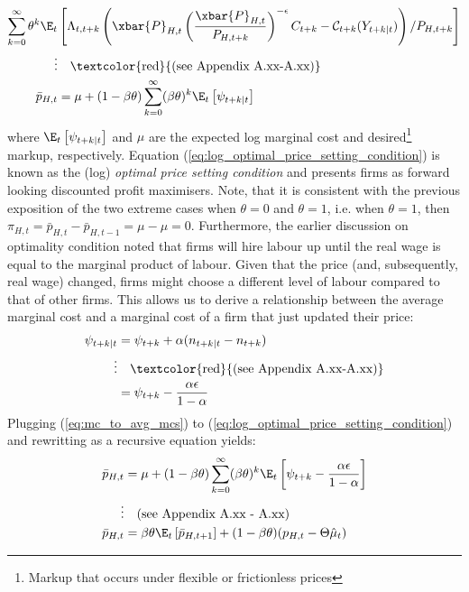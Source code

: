 \begin{align}
    \sum_{k=0}^{\infty} \theta^k \E_t &\left[\Lambda_{t,t+k} \left( \xbar{P}_{H,t} \left(\frac{\xbar{P}_{H,t}}{P_{H,t+k}}\right)^{-\epsilon} C_{t+k} - \mathcal{C}_{t+k}(Y_{t+k|t})\right) / P_{H,t+k} \right] \\
    \vdots & \quad \text{\textcolor{red}{(see Appendix A.xx-A.xx)}} \nonumber \\
    \bar{p}_{H,t} &= \mu + (1-\beta \theta) \sum_{k=0}^{\infty} (\beta \theta)^{k} \E_t \left[ \psi_{t+k|t} \right] \label{eq:log_optimal_price_setting_condition}
\end{align}
where $\E_t \left[ \psi_{t+k|t} \right]$ and $\mu$ are the expected log marginal cost and desired\footnote{Markup that occurs under flexible or frictionless prices} markup, respectively. Equation (\ref{eq:log_optimal_price_setting_condition}) is known as the (log) \textit{optimal price setting condition} and presents firms as forward looking discounted profit maximisers. Note, that it is consistent with the previous exposition of the two extreme cases when $\theta = 0$ and $\theta = 1$, i.e. when $\theta = 1$, then $\pi_{H,t} = \bar{p}_{H,t} - \bar{p}_{H,t-1} = \mu - \mu = 0$. Furthermore, the earlier discussion on optimality condition noted that firms will hire labour up until the real wage is equal to the marginal product of labour. Given that the price (and, subsequently, real wage) changed, firms might choose a different level of labour compared to that of other firms. This allows us to derive a relationship between the average marginal cost and a marginal cost of a firm that just updated their price:
\begin{align}
     \psi_{t+k|t} &=  \psi_{t+k} + \alpha(n_{t+k|t} - n_{t+k}) \\
     \vdots & \quad \text{\textcolor{red}{(see Appendix A.xx-A.xx)}} \nonumber \\
     &=\psi_{t+k} - \frac{\alpha \epsilon}{1-\alpha} \label{eq:mc_to_avg_mcs}
\end{align}
Plugging (\ref{eq:mc_to_avg_mcs}) to (\ref{eq:log_optimal_price_setting_condition}) and rewritting as a recursive equation yields:
\begin{align}
    \bar{p}_{H,t} &= \mu + (1-\beta \theta) \sum_{k=0}^{\infty} (\beta \theta)^{k} \E_t \left[ \psi_{t+k} - \frac{\alpha \epsilon}{1-\alpha} \right]\\
    \vdots & \quad \text{(see Appendix A.xx - A.xx)} \nonumber \\
    \bar{p}_{H,t} &= \beta \theta \E_t \left[ \bar{p}_{H,t+1} \right] + (1-\beta \theta)(p_{H,t} - \Theta \hat{\mu}_t) \label{eq:dynamic_price_recursive}
\end{align}
